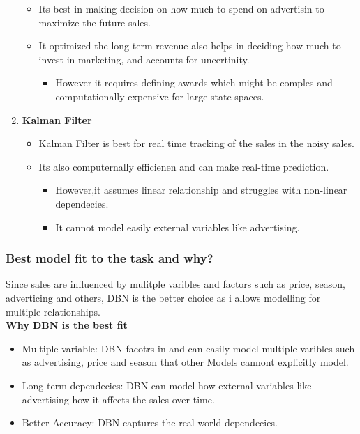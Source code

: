 \documentclass{article}
\begin{document}
\begin{enumerate}
    \begin{itemize}
        \item Its best in making decision on how much to spend on advertisin to maximize the future sales.
        \item It optimized the long term revenue also helps in deciding how much to invest in marketing, and accounts for uncertinity.
        \begin{itemize}
            \item However it requires defining awards which might be comples and computationally expensive for large state spaces.
        \end{itemize}
    \end{itemize}
    \item \textbf{Kalman Filter}
    \begin{itemize}
        \item Kalman Filter is best for real time tracking of the sales in the noisy sales.
        \item Its also computernally efficienen and can make real-time prediction.
        \begin{itemize}
            \item However,it assumes linear relationship and struggles with non-linear dependecies.
            \item It cannot model easily external variables like advertising.
        \end{itemize}
    \end{itemize}
\end{enumerate}

\subsubsection*{Best model fit to the task and why?}
Since sales are influenced by mulitple varibles and factors such as price, season, adverticing and others, DBN is the better choice as i allows modelling for multiple relationships.\\

\textbf{Why DBN is the best fit}
\begin{itemize}
    \item Multiple variable: DBN facotrs in and can easily model multiple varibles such as advertising, price and season that other Models cannont explicitly model.
    \item Long-term dependecies: DBN can model how external variables like advertising how it affects the sales over time.
    \item Better Accuracy: DBN captures the real-world dependecies.
\end{itemize}
\end{document}
